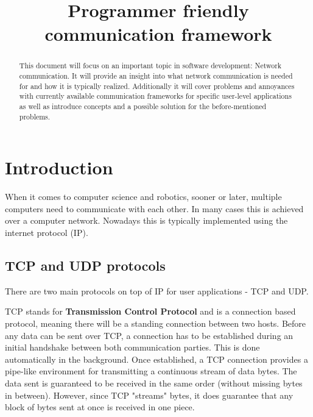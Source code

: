 \documentclass[conference]{IEEEtran}
\begin{document}
\title{Programmer friendly communication framework}

\author{
    \and
}

\maketitle

\begin{abstract}
    This document will focus on an important topic in software development: Network communication. It will provide an insight into what network communication is needed for and how it is typically realized. Additionally it will cover problems and annoyances with currently available communication frameworks for specific user-level applications as well as introduce concepts and a possible solution for the before-mentioned problems.
\end{abstract}

\section{Introduction}

When it comes to computer science and robotics, sooner or later, multiple computers need to communicate with each other. In many cases this is achieved over a computer network. Nowadays this is typically implemented using the internet protocol (IP).


\subsection{TCP and UDP protocols}

There are two main protocols on top of IP for user applications - TCP and UDP. 

TCP stands for \textbf{Transmission Control Protocol} and is a connection based protocol, meaning there will be a standing connection between two hosts. Before any data can be sent over TCP, a connection has to be established during an initial handshake between both communication parties. This is done automatically in the background. Once established, a TCP connection provides a pipe-like environment for transmitting a continuous stream of data bytes. The data sent is guaranteed to be received in the same order (without missing bytes in between). However, since TCP "streams" bytes, it does guarantee that any block of bytes sent at once is received in one piece.
\end{document}
